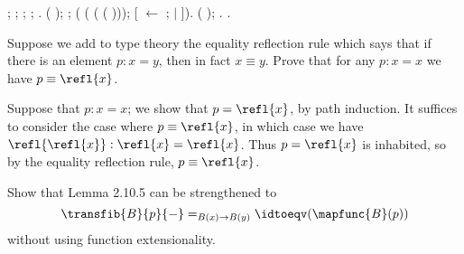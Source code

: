 \begin{coqdoccode}
\coqdocindent{1.00em}
 ;  ;  ;  ; .\coqdoceol
\coqdocindent{1.00em}
 ( ); ;\coqdoceol
\coqdocindent{2.00em}
 ( ( ( ( )));\coqdoceol
\coqdocindent{3.00em}
[ \ensuremath{\leftarrow} ;  \ensuremath{|}  ]).\coqdoceol
\coqdocindent{1.00em}
 ( ); .\coqdoceol
\coqdocnoindent
{}.\coqdoceol
\coqdocemptyline
\coqdocemptyline
\end{coqdoccode}
Suppose we add to type theory the equality reflection rule which says that if
there is an element $p : x = y$, then in fact $x \equiv y$.  Prove that for any
$p : x = x$ we have $p \equiv \refl{x}$.


 \soln
Suppose that $p : x = x$; we show that $p = \refl{x}$, by path induction.  It
suffices to consider the case where $p \equiv \refl{x}$, in which case we have
$\refl{\refl{x}} : \refl{x} = \refl{x}$.  Thus $p = \refl{x}$ is inhabited, so
by the equality reflection rule, $p \equiv \refl{x}$.


Show that Lemma 2.10.5 can be strengthened to
\[
  \transfib{B}{p}{-} =_{B(x)\to B(y)} \idtoeqv(\mapfunc{B}(p))
\]
without using function extensionality.



